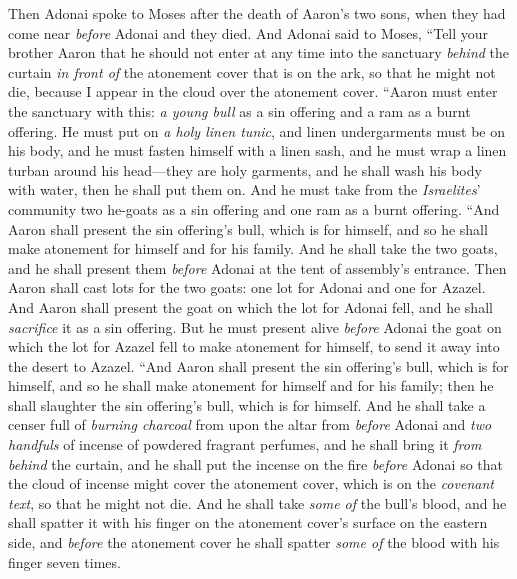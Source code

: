 \begin{biblechapter} %
 Then Adonai spoke to Moses after the death of Aaron’s two sons, when they had come near \textit{before} Adonai and they died.
\verse And Adonai said to Moses, “Tell your brother Aaron that he should not enter at any time into the sanctuary \textit{behind} the curtain \textit{in front of} the atonement cover that is on the ark, so that he might not die, because I appear in the cloud over the atonement cover.
\verse “Aaron must enter the sanctuary with this: \textit{a young bull} as a sin offering and a ram as a burnt offering.
\verse He must put on \textit{a holy linen tunic}, and linen undergarments must be on his body, and he must fasten himself with a linen sash, and he must wrap a linen turban around his head—they are holy garments, and he shall wash his body with water, then he shall put them on.
\verse And he must take from the \textit{Israelites}’ community two he-goats as a sin offering and one ram as a burnt offering.
\verse “And Aaron shall present the sin offering’s bull, which is for himself, and so he shall make atonement for himself and for his family.
\verse And he shall take the two goats, and he shall present them \textit{before} Adonai at the tent of assembly’s entrance.
\verse Then Aaron shall cast lots for the two goats: one lot for Adonai and one for Azazel.
\verse And Aaron shall present the goat on which the lot for Adonai fell, and he shall \textit{sacrifice} it as a sin offering.
\verse But he must present alive \textit{before} Adonai the goat on which the lot for Azazel fell to make atonement for himself, to send it away into the desert to Azazel.
\verse “And Aaron shall present the sin offering’s bull, which is for himself, and so he shall make atonement for himself and for his family; then he shall slaughter the sin offering’s bull, which is for himself.
\verse And he shall take a censer full of \textit{burning charcoal} from upon the altar from \textit{before} Adonai and \textit{two handfuls} of incense of powdered fragrant perfumes, and he shall bring it \textit{from behind} the curtain,
\verse and he shall put the incense on the fire \textit{before} Adonai so that the cloud of incense might cover the atonement cover, which is on the \textit{covenant text}, so that he might not die.
\verse And he shall take \textit{some of} the bull’s blood, and he shall spatter it with his finger on the atonement cover’s surface on the eastern side, and \textit{before} the atonement cover he shall spatter \textit{some of} the blood with his finger seven times.

\end{biblechapter}
